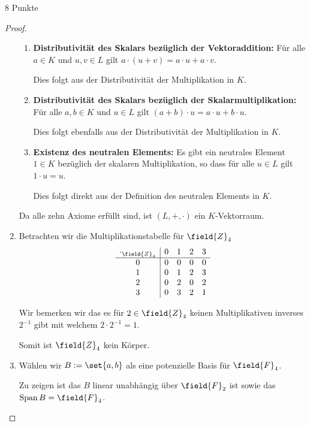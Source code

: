 \documentclass{../problemset}
\begin{document}
\begin{problem}{8 Punkte}
\begin{proof}
\begin{enumerate}
\begin{enumerate}
			      \item \textbf{Distributivität des Skalars bezüglich der Vektoraddition:} Für alle $a \in K$ und $u, v \in L$ gilt $a \cdot (u + v) = a \cdot u + a \cdot v$.

			            Dies folgt aus der Distributivität der Multiplikation in $K$.

			      \item \textbf{Distributivität des Skalars bezüglich der Skalarmultiplikation:} Für alle $a, b \in K$ und $u \in L$ gilt $(a + b) \cdot u = a \cdot u + b \cdot u$.

			            Dies folgt ebenfalls aus der Distributivität der Multiplikation in $K$.

			      \item \textbf{Existenz des neutralen Elements:} Es gibt ein neutrales Element $1 \in K$ bezüglich der skalaren Multiplikation, so dass für alle $u \in L$ gilt $1 \cdot u = u$.

			            Dies folgt direkt aus der Definition des neutralen Elements in $K$.
		      \end{enumerate}

		      Da alle zehn Axiome erfüllt sind, ist $(L, +, \cdot)$ ein $K$-Vektorraum.

		\item Betrachten wir die Multiplikationstabelle für $\field{Z}_4$
		      \[
			      \begin{array}{c|cccc}
				      \cdot_{\field{Z}_4} & 0 & 1 & 2 & 3 \\
				      \hline
				      0                   & 0 & 0 & 0 & 0 \\
				      1                   & 0 & 1 & 2 & 3 \\
				      2                   & 0 & 2 & 0 & 2 \\
				      3                   & 0 & 3 & 2 & 1 \\
			      \end{array}
		      \]

		      Wir bemerken wir das es für $2 \in \field{Z}_4$ keinen Multiplikativen inverses $2^{-1}$ gibt mit welchem $2 \cdot 2^{-1} = 1$.

		      Somit ist $\field{Z}_4$ kein Körper. \checkmark
		\item Wählen wir $B := \set{a, b}$ als eine potenzielle Basis für $\field{F}_4$.

		      Zu zeigen ist das $B$ linear unabhängig über $\field{F}_2$ ist sowie das $\operatorname{Span} B = \field{F}_4$.


\end{enumerate}
\end{proof}
\end{problem}
\end{document}
